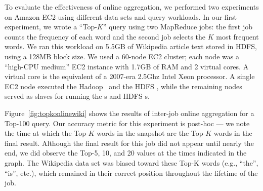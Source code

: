 To evaluate the effectiveness of online aggregation, we performed two
experiments on Amazon EC2 using different data sets and query workloads. In our
first experiment, we wrote a ``Top-$K$'' query using two MapReduce jobs: the
first job counts the frequency of each word and the second job selects the $K$
most frequent words. We ran this workload on 5.5GB of Wikipedia article text
stored in HDFS, using a 128MB block size. We used a 60-node EC2 cluster; each
node was a ``high-CPU medium'' EC2 instance with 1.7GB of RAM and 2 virtual
cores. A virtual core is the equivalent of a 2007-era 2.5Ghz Intel Xeon
processor. A single EC2 node executed the Hadoop \JT\ and the HDFS \NN, while
the remaining nodes served as slaves for running the {\TT}s and HDFS {\DN}s.



Figure~\ref{fig:topkonlinewiki} shows the results of inter-job online
aggregation for a Top-100 query. Our accuracy metric for this experiment is
post-hoc --- we note the time at which the Top-$K$ words in the snapshot are the
Top-$K$ words in the final result. Although the final result for this job did
not appear until nearly the end, we did observe the Top-5, 10, and 20 values at
the times indicated in the graph. The Wikipedia data set was biased toward these
Top-K words (e.g., ``the'', ``is'', etc.), which remained in their correct
position throughout the lifetime of the job.

